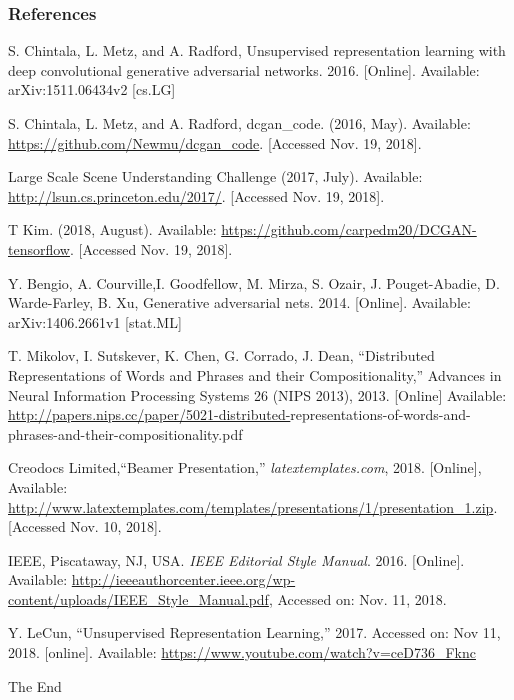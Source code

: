 \documentclass{beamer}
\begin{document}
\begin{frame}[allowframebreaks]
\frametitle{References}
\footnotesize{
\begin{thebibliography}{99} %

 S. Chintala, L. Metz, and A. Radford, 
Unsupervised representation learning with deep convolutional generative 
adversarial networks.  2016. [Online]. Available: arXiv:1511.06434v2 [cs.LG]

 S. Chintala, L. Metz, and A. Radford, dcgan\_code. (2016,
May).  Available: \url{https://github.com/Newmu/dcgan\_code}. [Accessed Nov. 19,
2018].

 Large Scale Scene Understanding Challenge (2017, July).
Available: \url{http://lsun.cs.princeton.edu/2017/}. [Accessed Nov. 19, 2018].

 T Kim. (2018, August).  Available: \url{https://github.com/carpedm20/DCGAN-tensorflow}. [Accessed Nov. 19, 2018].


 Y. Bengio, A. Courville,I. Goodfellow, M. Mirza, S. Ozair,  
J. Pouget-Abadie,  D. Warde-Farley, B. Xu, Generative adversarial nets. 2014. 
[Online]. Available: arXiv:1406.2661v1 [stat.ML]

 T. Mikolov, I. Sutskever, K. Chen, G. Corrado, J. Dean,
``Distributed Representations of Words and Phrases and their Compositionality,''
Advances in Neural Information Processing Systems 26 (NIPS 2013), 2013. 
[Online] Available: \url{http://papers.nips.cc/paper/5021-distributed-}representations-of-words-and-phrases-and-their-compositionality.pdf

 Creodocs Limited,``Beamer Presentation,''
\emph{latextemplates.com}, 2018. [Online], Available: 
\url{http://www.latextemplates.com/templates/presentations/1/presentation\_1.zip}. [Accessed Nov. 10, 2018].

 IEEE, Piscataway, NJ, USA. \emph{IEEE Editorial Style Manual}. 2016.
[Online]. Available: \url{http://ieeeauthorcenter.ieee.org/wp-content/uploads/IEEE\_Style_Manual.pdf}, Accessed on: Nov. 11, 2018.

 Y. LeCun, ``Unsupervised Representation Learning,''
2017. Accessed on: Nov 11, 2018. [online]. Available: \url{https://www.youtube.com/watch?v=ceD736_Fknc}  
\end{thebibliography}
}
\end{frame}


\begin{frame}
\Huge{\centerline{The End}}
\end{frame}

\end{document}
